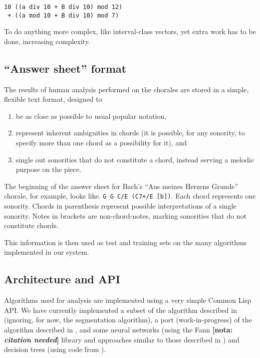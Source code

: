 \documentclass{article}
\newcommand{\nota}[1]{
  \textbf{[nota: \textit{#1}]}
}
\begin{document}
\begin{verbatim}
10 ((a div 10 + B div 10) mod 12)
 + ((a mod 10 + B div 10) mod 7)
\end{verbatim}

To do anything more complex, like interval-class vectors, yet extra
work has to be done, increasing complexity.

\subsection{``Answer sheet'' format}
\label{sec:formato-dos-acordes}

The results of human analysis performed on the chorales are stored in
a simple, flexible text format, designed to

\begin{enumerate}
\item be as close as possible to
usual popular notation,
\item represent inherent ambiguities in chords (it is possible, for
  any sonority, to specify more than one chord as a possibility for
  it), and
\item single out sonorities that do not constitute a chord, instead
  serving a melodic purpose on the piece.
\end{enumerate}

The beginning of the answer sheet for Bach's ``Aus meines Herzens
Grunde'' chorale, for example, looks like. \texttt{G G C/E (C7+/E
  [b])}. Each chord represents one sonority. Chords in parenthesis
represent possible interpretations of a single sonority. Notes in
brackets are non-chord-notes, marking sonorities that do not
constitute chords.

This information is then used as test and training sets on the many
algorithms implemented in our system.

\subsection{Architecture and API}
\label{sec:architecture-and-api}

Algorithms used for analysis are implemented using a very simple
Common Lisp API. We have currently implemented a subset of the
algorithm described in \cite{pardo02:algorithms} (ignoring, for now,
the segmentation algorithm), a port (work-in-progress) of the
algorithm described in \cite{temperley99:modeling}, and some neural
networks (using the Fann \nota{citation needed} library and approaches
similar to those described in
\cite{tsui02:_harmon_analy_using_neural_networ}) and decision trees
(using code from \cite{Mitchell:1997:ML}).
\end{document}
